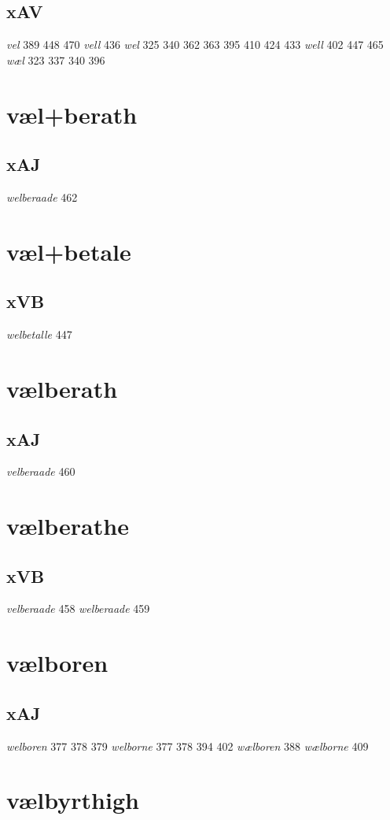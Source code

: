 \documentclass[a4paper,twocolumn]{article}
\begin{document}
\subsection{xAV}
\label{sec:org55854a5}
\emph{vel} 389 448 470 \emph{vell} 436 \emph{wel} 325 340 362 363 395 410 424 433 \emph{well} 402 447 465 \emph{wæl} 323 337 340 396 
\section{væl+berath}
\label{sec:orga31b54d}
\subsection{xAJ}
\label{sec:orgc9cab75}
\emph{welberaade} 462 
\section{væl+betale}
\label{sec:org12c04d8}
\subsection{xVB}
\label{sec:org3044a74}
\emph{welbetalle} 447 
\section{vælberath}
\label{sec:orgdca7c79}
\subsection{xAJ}
\label{sec:orga5ee76b}
\emph{velberaade} 460 
\section{vælberathe}
\label{sec:org498d9ff}
\subsection{xVB}
\label{sec:orgce1e4e5}
\emph{velberaade} 458 \emph{welberaade} 459 
\section{vælboren}
\label{sec:orgb748cc8}
\subsection{xAJ}
\label{sec:org502f28b}
\emph{welboren} 377 378 379 \emph{welborne} 377 378 394 402 \emph{wælboren} 388 \emph{wælborne} 409 
\section{vælbyrthigh}
\label{sec:org3ee4d81}
\end{document}

